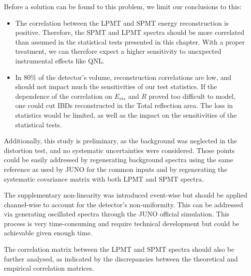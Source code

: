 \documentclass[../main.tex]{subfiles}
\begin{document}
Before a solution can be found to this problem, we limit our conclusions to this:

\begin{itemize}
  \item The correlation between the LPMT and SPMT energy reconstruction is positive. Therefore, the SPMT and LPMT spectra should be more correlated than assumed in the statistical tests presented in this chapter. With a proper treatment, we can therefore expect a higher sensitivity to unexpected instrumental effects like QNL.

  \item In 80\% of the detector's volume, reconstruction correlations are low, and should not impact much the sensitivities of our test statistics. If the dependence of the correlation on $E_{vis}$ and $R$ proved too difficult to model, one could cut IBDs reconstructed in the Total reflection area. The loss in statistics would be limited, as well as the impact on the sensitivities of the statistical tests.
\end{itemize}

Additionally, this study is preliminary, as the background was neglected in the distortion test, and no systematic uncertainties were considered. Those points could be easily addressed by regenerating background spectra using the same reference as used by JUNO for the common inputs and by regenerating the systematic covariance matrix with both LPMT and SPMT spectra.

The supplementary non-linearity was introduced event-wise but should be applied channel-wise to account for the detector's non-uniformity. This can be addressed via generating oscillated spectra through the JUNO official simulation. This process is very time-consuming and require technical development but could be achievable given enough time.

The correlation matrix between the LPMT and SPMT spectra should also be further analysed, as indicated by the discrepancies between the theoretical and empirical correlation matrices.
\end{document}
